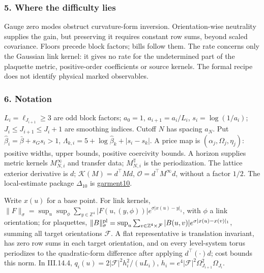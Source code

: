\documentclass[
  letterpaper,
  11pt]{article}
\begin{document}
\subsubsection{5. Where the difficulty
lies}\label{where-the-difficulty-lies-16}

Gauge zero modes obstruct curvature-form inversion. Orientation-wise
neutrality supplies the gain, but preserving it requires constant row
sums, beyond scaled covariance. Floors precede block factors; bills
follow them. The rate concerns only the Gaussian link kernel: it gives
no rate for the undetermined part of the plaquette metric,
positive-order coefficients or source kernels. The formal recipe does
not identify physical marked observables.

\subsubsection{6. Notation}\label{notation-16}

\(L_i=\ell_{J_{i+1}}\ge3\) are odd block factors; \(a_0=1\),
\(a_{i+1}=a_i/L_i\), \(s_i=\log(1/a_i)\); \(J_i\le J_{i+1}\le J_i+1\)
are smoothing indices. Cutoff \(N\) has spacing \(a_N\). Put
\(\hat\beta_i=\bar\beta+s_Gs_i>1\),
\(\Lambda_{k,i}=5+\log\hat\beta_k+|s_i-s_k|\). A price map is
\((\alpha_j,\Omega_j,\eta_j)\): positive widths, upper bounds, positive
coercivity bounds. A horizon supplies metric kernels \(M^\infty_{N,i}\)
and transfer data; \(M^{\mathbb T}_{N,i}\) is the periodization. The
lattice exterior derivative is \(d\); \(\mathcal K(M)=d^\top Md\),
\(\mathcal O=d^\top M^\infty d\), without a factor \(1/2\). The
local-estimate package \(\Delta_{10}\) is
\href{https://github.com/yang-mills-group/OpenAI-YM-20261028/blob/3456e5e75cf8d4cd558955a5c7638fba2d68f464/YM/RG12/Burst/Wardrobe.lean\#L63}{garment10}.

Write \(x(u)\) for a base point. For link kernels,
\(\lVert F\rVert_\sigma=\sup_u\sup_\phi\sum_{y\in\mathbb Z^4}|F(u,(y,\phi))|e^{\sigma|x(u)-y|_1}\),
with \(\phi\) a link orientation; for plaquettes,
\(\lVert B\rVert^{\rm pl}_\sigma=\sup_u\sum_{v\in\mathbb Z^4\times\mathcal F}|B(u,v)|e^{\sigma|x(u)-x(v)|_1}\),
summing all target orientations \(\mathcal F\). A flat representative is
translation invariant, has zero row sums in each target orientation, and
on every level-system torus periodizes to the quadratic-form difference
after applying \(d^\top(\cdot)d\); cost bounds this norm. In III.14.4,
\(q_i(u)=2|\mathcal F|^2h_i^2/(uL_i)\),
\(h_i=e^4|\mathcal F|^2\Omega_{J_{i+1}}^2\Omega_{J_i}\).
\end{document}
